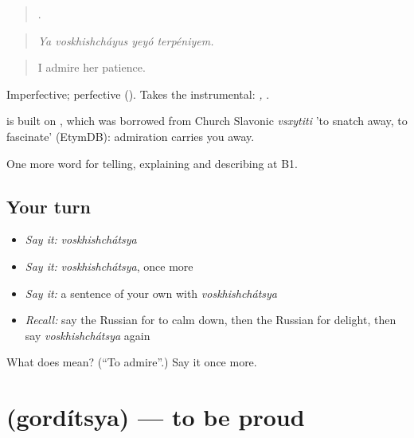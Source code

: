 \begin{quote}
   .
\end{quote}

\begin{quote}
\emph{Ya voskhishcháyus yeyó terpéniyem.}
\end{quote}

\begin{quote}
I admire her patience.
\end{quote}

Imperfective; perfective  (). Takes the instrumental: \emph{ , }.

\begin{cousinweb}
\emph{} is built on \emph{}, which was borrowed from Church Slavonic \emph{vsxytiti} 'to snatch away, to fascinate' (EtymDB): admiration carries you away.
\end{cousinweb}

\begin{grammarlens}[title={What you've built}]
One more word for telling, explaining and describing at B1.
\end{grammarlens}

\subsection*{Your turn}
\begin{itemize}
\raggedright
  \item \emph{Say it:} \emph{voskhishchátsya}
  \item \emph{Say it:} \emph{voskhishchátsya}, once more
  \item \emph{Say it:} a sentence of your own with \emph{voskhishchátsya}
  \item \emph{Recall:} say the Russian for to calm down, then the Russian for delight, then say \emph{voskhishchátsya} again
\end{itemize}

\begin{tcolorbox}[breakable,colback=teal!4,colframe=teal!35!black,title={Before you move on}]
What does  mean? (\textquotedblleft{}To admire\textquotedblright{}.) Say it once more.
\end{tcolorbox}
\section[\texorpdfstring{\ru{гордиться} (gordítsya)}{гордиться (gordítsya)}]{ (gordítsya) — to be proud}

